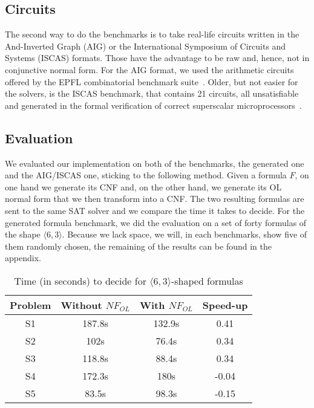 \documentclass[a4paper, 11pt]{article}
\begin{document}
    \subsection{Circuits}
    The second way to do the benchmarks is to take real-life circuits written in the
    And-Inverted Graph (AIG) or the International Symposium of Circuits and Systems (ISCAS) formats. 
    Those have the advantage to be raw and, hence, not in 
    conjunctive normal form. For the AIG format, we used the arithmetic circuits offered by the EPFL 
    combinatorial benchmark suite~\cite{item_309aea67b5a145328a6f0a141d8f1ab3}. Older, but not easier for
    the solvers, is the ISCAS benchmark, that contains 21 circuits, all unsatisfiable and generated in 
    the formal verification of correct superscalar microprocessors~\cite{velev}.
    \subsection{Evaluation}
    We evaluated our implementation on both of the benchmarks, the generated one and the AIG/ISCAS one, 
    sticking to the
    following method. Given a formula $F$, on one hand we generate its CNF and, on the other hand,
    we generate its OL normal form that we then transform into a CNF. The two resulting formulas are
    sent to the same SAT solver and we compare the time it takes to decide. For the generated formula
    benchmark, we did the evaluation on a set of forty formulas of the shape $\langle6,3\rangle$. Because
    we lack space, we will, in each benchmarks, show five of them randomly chosen, the remaining of the 
    results can be found in the appendix.
    \begin{table}[h]
	    \begin{center} 
		    \begin{tabular}{|| c || c c c||}
		    \hline
			    Problem&Without $NF_{OL}$&With $NF_{OL}$&Speed-up\\
			    \hline
			    S1 & 187.8s & 132.9s&0.41\\\hline
			    S2 & 102s & 76.4s&0.34\\\hline 
			    S3 & 118.8s & 88.4s&0.34\\\hline 
			    S4 & 172.3s & 180s&-0.04\\\hline
			    S5 & 83.5s & 98.3s&-0.15\\\hline  
		    \end{tabular}
		    \caption{Time (in seconds) to decide for $\langle 6,3\rangle$-shaped formulas}
	    \end{center}
    \end{table}
\end{document}
